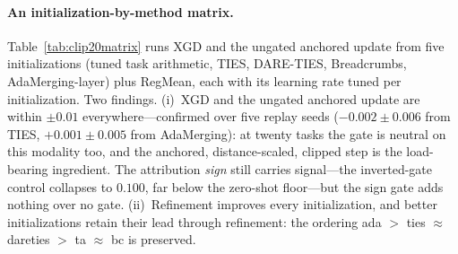 \documentclass{article} %
\begin{document}
\paragraph{An initialization-by-method matrix.}
Table~\ref{tab:clip20matrix} runs XGD and the ungated anchored update from five initializations (tuned task arithmetic, TIES, DARE-TIES, Breadcrumbs, AdaMerging-layer) plus RegMean, each with its learning rate tuned per initialization. Two findings. (i)~XGD and the ungated anchored update are within $\pm 0.01$ everywhere---confirmed over five replay seeds ($-0.002\pm0.006$ from TIES, $+0.001\pm0.005$ from AdaMerging): at twenty tasks the gate is neutral on this modality too, and the anchored, distance-scaled, clipped step is the load-bearing ingredient. The attribution \emph{sign} still carries signal---the inverted-gate control collapses to $0.100$, far below the zero-shot floor---but the sign gate adds nothing over no gate. (ii)~Refinement improves every initialization, and better initializations retain their lead through refinement: the ordering ada $>$ ties $\approx$ dareties $>$ ta $\approx$ bc is preserved.
\fi
\end{document}
